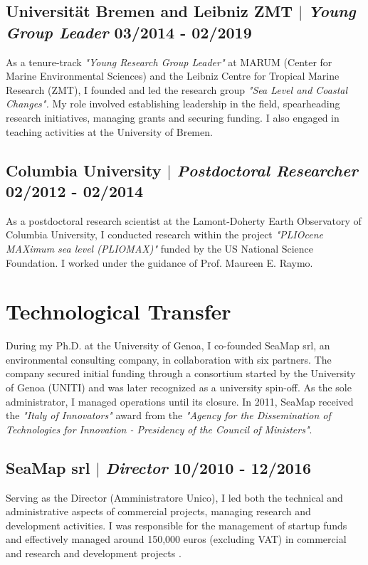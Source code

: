 \documentclass[11pt]{article}
\begin{document}
\subsection{Universität Bremen and Leibniz ZMT $|$ {\normalfont\textit{Young Group Leader}} \hfill 03/2014 - 02/2019}
{\footnotesize As a tenure-track \textit{"Young Research Group Leader"} at MARUM (Center for Marine Environmental Sciences) and the Leibniz Centre for Tropical Marine Research (ZMT), I founded and led the research group \textit{"Sea Level and Coastal Changes".} My role involved establishing leadership in the field, spearheading research initiatives, managing grants and securing funding. I also engaged in teaching activities at the University of Bremen.}
\bigskip

\subsection{Columbia University $|$ {\normalfont\textit{Postdoctoral Researcher}} \hfill 02/2012 - 02/2014}
{\footnotesize As a postdoctoral research scientist at the Lamont-Doherty Earth Observatory of Columbia University, I conducted research within the project \textit{"PLIOcene MAXimum sea level (PLIOMAX)"} funded by the US National Science Foundation. I worked under the guidance of Prof. Maureen E. Raymo.}
\bigskip

\section{Technological Transfer}
{\normalfont During my Ph.D. at the University of Genoa, I co-founded SeaMap srl, an environmental consulting company, in collaboration with six partners. The company secured initial funding through a consortium started by the University of Genoa (UNITI) and was later recognized as a university spin-off. As the sole administrator, I managed operations until its closure. In 2011, SeaMap received the \textit{"Italy of Innovators"} award from the \textit{"Agency for the Dissemination of Technologies for Innovation - Presidency of the Council of Ministers"}.}\\
\bigskip

\subsection{SeaMap srl $|$ {\normalfont\textit{Director}} \hfill 10/2010 - 12/2016}
{\footnotesize Serving as the Director (Amministratore Unico), I led both the technical and administrative aspects of commercial projects, managing research and development activities. I was responsible for the management of startup funds and effectively managed around 150,000 euros (excluding VAT) in commercial and research and development projects .}
\end{document}
